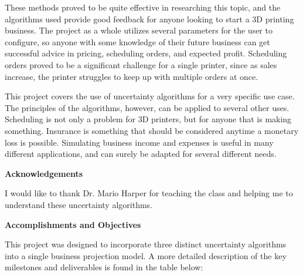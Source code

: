 \documentclass[11pt]{article}
\begin{document}
These methods proved to be quite effective in researching this topic, and the algorithms used provide
good feedback for anyone looking to start a 3D printing business. The project as a whole utilizes several
parameters for the user to configure, so anyone with some knowledge of their future business can get
successful advice in pricing, scheduling orders, and expected profit. Scheduling orders proved to be a
significant challenge for a single printer, since as sales increase, the printer struggles to keep up
with multiple orders at once.

This project covers the use of uncertainty algorithms for a very specific use case. The principles of
the algorithms, however, can be applied to several other uses. Scheduling is not only a problem for
3D printers, but for anyone that is making something. Insurance is something that should be considered
anytime a monetary loss is possible. Simulating business income and expenses is useful in many different
applications, and can surely be adapted for several different needs.

\begin{center}
    \LARGE
    \textbf{Acknowledgements}
\end{center}

I would like to thank Dr. Mario Harper for teaching the class and helping me to understand these
uncertainty algorithms.

\begin{center}
    \LARGE
    \textbf{Accomplishments and Objectives}
\end{center}

%
%

This project was designed to incorporate three distinct uncertainty algorithms into a single
business projection model. A more detailed description of the key milestones and deliverables
is found in the table below:
\end{document}
